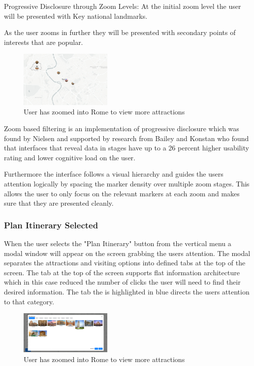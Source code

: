 \documentclass[]{project_final}
\begin{document}
Progressive Disclosure through Zoom Levels:
At the initial zoom level the user will be presented with Key national landmarks.


As the user zooms in further they will be presented with secondary points of interests that are popular.

\begin{figure}[H]
  \centering
  \includegraphics[width=0.4\textwidth]{biggerzoom.png}
  \caption{User has zoomed into Rome to view more attractions}
  \label{fig:1}
\end{figure}

Zoom based filtering is an implementation of progressive disclosure which was found by Nielsen and supported by research from Bailey and Konstan who found that interfaces that reveal data in stages have up to a 26 percent higher usability rating and lower cognitive load on the user.

Furthermore the interface follows a visual hierarchy and guides the users attention logically by spacing the marker density over multiple zoom stages. This allows the user to only focus on the relevant markers at each zoom and makes sure that they are presented cleanly.

\subsubsection{Plan Itinerary Selected}

When the user selects the "Plan Itinerary" button from the vertical menu a modal window will appear on the screen grabbing the users attention.
The modal separates the attractions and visiting options into defined tabs at the top of the screen. The tab at the top of the screen supports flat information architecture which in this case reduced the number of clicks the user will need to find their desired information. The tab the is highlighted in blue directs the users attention to that category.

\begin{figure}[H]
  \centering
  \includegraphics[width=0.4\textwidth]{planItin.png}
  \caption{User has zoomed into Rome to view more attractions}
  \label{fig:1}
\end{figure}
\end{document}
